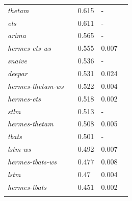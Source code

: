 \documentclass[10pt]{article} %
\begin{document}
\begin{table}
{\begin{tabular}{l||llll}
	 \textit{thetam} && 0.615 & -\\ 
	 \textit{ets} && 0.611 & -\\ 
	 \textit{arima} && 0.565 & -\\ 
	 \textit{hermes-ets-ws} && 0.555 & 0.007\\ 
	 \textit{snaive} && 0.536 & -\\  
	 \textit{deepar} && 0.531 & 0.024\\ 
 	 \textit{hermes-thetam-ws} && 0.522 & 0.004\\ 
	 \textit{hermes-ets} && 0.518 & 0.002\\ 
	 \textit{stlm} && 0.513 & -\\ 
	 \textit{hermes-thetam} && 0.508 & 0.005\\ 
	 \textit{tbats} && 0.501 & -\\ 
	 \textit{lstm-ws} && 0.492 & 0.007\\ 
	 \textit{hermes-tbats-ws} && 0.477 & 0.008\\ 
	 \textit{lstm} && 0.47 & 0.004\\ 
	 \textit{hermes-tbats} && 0.451 & 0.002\\  \vspace{0.5cm}\\
  \end{tabular}
 }
\end{table}
\end{document}
